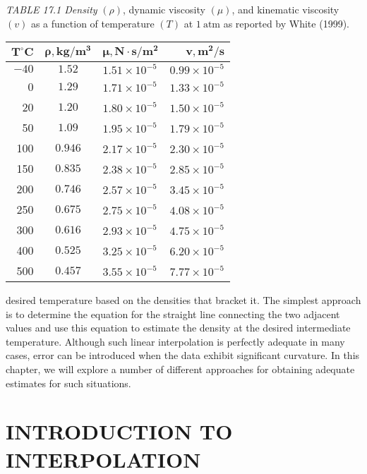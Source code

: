 \documentclass[../main.tex]{subfiles}
\begin{document}
\noindent\textit{TABLE 17.1 Density} $(\rho)$, dynamic viscosity $(\mu)$, and kinematic viscosity $(v)$ as a function of temperature $(T)$ at $1 \mathrm{~atm}$ as reported by White (1999).
\begin{center}
\begin{tabular}{rclr}
\hline $\boldsymbol{T}^{\circ} \mathbf{C}$ & $\boldsymbol{\rho}, \mathbf{k g} / \mathbf{m}^{\mathbf{3}}$ & $\boldsymbol{\mu}, \mathbf{N} \cdot \mathbf{s} / \mathbf{m}^{\mathbf{2}}$ & $\boldsymbol{v}, \mathbf{m}^{\mathbf{2}} / \mathbf{s}$ \\
\hline$-40$ & $1.52$ & $1.51 \times 10^{-5}$ & $0.99 \times 10^{-5}$ \\
0 & $1.29$ & $1.71 \times 10^{-5}$ & $1.33 \times 10^{-5}$ \\
20 & $1.20$ & $1.80 \times 10^{-5}$ & $1.50 \times 10^{-5}$ \\
50 & $1.09$ & $1.95 \times 10^{-5}$ & $1.79 \times 10^{-5}$ \\
100 & $0.946$ & $2.17 \times 10^{-5}$ & $2.30 \times 10^{-5}$ \\
150 & $0.835$ & $2.38 \times 10^{-5}$ & $2.85 \times 10^{-5}$ \\
200 & $0.746$ & $2.57 \times 10^{-5}$ & $3.45 \times 10^{-5}$ \\
250 & $0.675$ & $2.75 \times 10^{-5}$ & $4.08 \times 10^{-5}$ \\
300 & $0.616$ & $2.93 \times 10^{-5}$ & $4.75 \times 10^{-5}$ \\
400 & $0.525$ & $3.25 \times 10^{-5}$ & $6.20 \times 10^{-5}$ \\
500 & $0.457$ & $3.55 \times 10^{-5}$ & $7.77 \times 10^{-5}$ \\
\hline
\end{tabular}
\end{center}
desired temperature based on the densities that bracket it. The simplest approach is to determine the equation for the straight line connecting the two adjacent values and use this
equation to estimate the density at the desired intermediate temperature. Although such
linear interpolation is perfectly adequate in many cases, error can be introduced when the
data exhibit significant curvature. In this chapter, we will explore a number of different
approaches for obtaining adequate estimates for such situations.

\vspace{2cm}
\section{INTRODUCTION TO INTERPOLATION}
\end{document}
